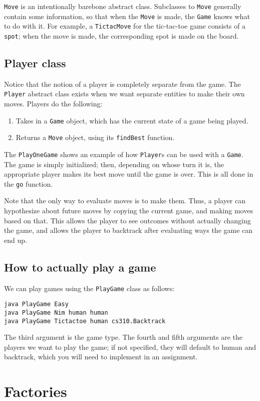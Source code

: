 \documentclass{article}
\begin{document}
\texttt{Move} is an intentionally barebone abstract class.  Subclasses to \texttt{Move} generally contain some information, so that when the \texttt{Move} is made, the \texttt{Game} knows what to do with it.  For example, a \texttt{TictacMove} for the tic-tac-toe game consists of a \texttt{spot}; when the move is made, the corresponding spot is made on the board.

\subsection{Player class}
Notice that the notion of a player is completely separate from the game.  The \texttt{Player} abstract class exists when we want separate entities to make their own moves.  Players do the following:
\begin{enumerate}
\item Takes in a \texttt{Game} object, which has the current state of a game being played.
\item Returns a \texttt{Move} object, using its \texttt{findBest} function.
\end{enumerate}
The \texttt{PlayOneGame} shows an example of how \texttt{Player}s can be used with a \texttt{Game}.  The game is simply initialized; then, depending on whose turn it is, the appropriate player makes its best move until the game is over.  This is all done in the \texttt{go} function.

Note that the only way to evaluate moves is to make them.  Thus, a player can hypothesize about future moves by copying the current game, and making moves based on that.  This allows the player to see outcomes without actually changing the game, and allows the player to backtrack after evaluating ways the game can end up.

\subsection{How to actually play a game}
We can play games using the \texttt{PlayGame} class as follows:
\begin{verbatim}
java PlayGame Easy
java PlayGame Nim human human                    
java PlayGame Tictactoe human cs310.Backtrack
\end{verbatim}
The third argument is the game type.  The fourth and fifth arguments are the players we want to play the game; if not specified, they will default to human and backtrack, which you will need to implement in an assignment.

\section{Factories}
\end{document}
